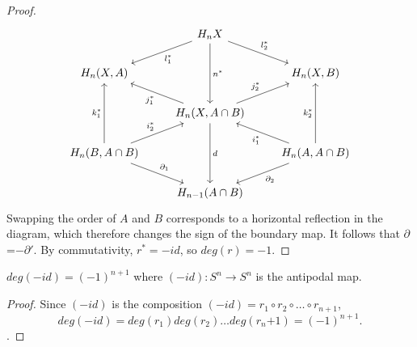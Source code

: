 \begin{proof}
\[\begin{tikzcd}
                                                                                  & H_n X \arrow[ld, "l_1^*"] \arrow[rd, "l_2^*"] \arrow[dd, "n^*"]          &                                                                                   \\
{H_n(X,A)}                                                                        &                                                                          & {H_n(X,B)}                                                                        \\
                                                                                  & {H_n(X,A\cap B)} \arrow[ru, "j_2^*"] \arrow[lu, "j_1^*"] \arrow[dd, "d"] &                                                                                   \\
{H_n(B,A\cap B)} \arrow[uu, "k_1^*"] \arrow[ru, "i_2^*"] \arrow[rd, "\partial_1"] &                                                                          & {H_n(A,A\cap B)} \arrow[uu, "k_2^*"] \arrow[lu, "i_1^*"] \arrow[ld, "\partial_2"] \\
                                                                                  & H_{n-1}(A\cap B)                                                         &                                                                                  
\end{tikzcd}\] Swapping the order of $A$ and $B$ corresponds to a horizontal reflection in the diagram, which therefore changes the sign of the boundary map. It follows that $\partial$=$-\partial'$. By commutativity, $r^*=-id$, so $deg(r)=-1$.

\end{proof}

\begin{corollary}\label{antipodal-degree}
$deg(-id)=(-1)^{n+1}$ where $(-id):S^n\rightarrow S^n$ is the antipodal map.
\end{corollary}
\begin{proof}
Since $(-id)$ is the composition $(-id)=r_1\circ r_2 \circ \dots \circ r_{n+1}$, $$deg(-id)=deg(r_1)deg(r_2)\dots deg(r_n{+1})=(-1)^{n+1}.$$
\cite{Hatcher}.
\end{proof}

